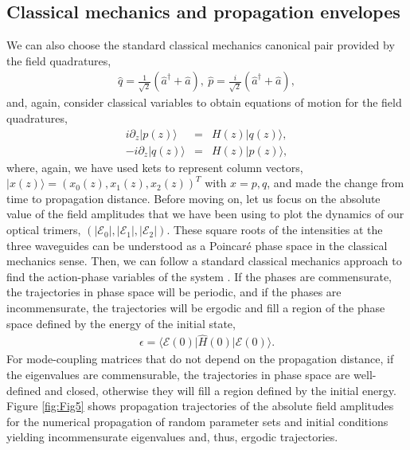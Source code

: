 \documentclass[9pt,twocolumn,twoside]{osajnl}
\begin{document}
\subsection{Classical mechanics and propagation envelopes }
We can also choose the standard classical mechanics canonical pair  provided by the field quadratures, 
\begin{eqnarray}
	\hat{q} = \frac{1}{\sqrt{2}} \left( \hat{a}^{\dagger} + \hat{a} \right), ~ 
	\hat{p} = \frac{i}{\sqrt{2}} \left( \hat{a}^{\dagger} + \hat{a} \right),
\end{eqnarray}
and, again, consider classical variables to obtain equations of motion for the field quadratures,
\begin{eqnarray}
	i \partial_z \vert p(z) \rangle	
	 &=&
	H(z) \vert q(z) \rangle , \\
-	i \partial_z \vert q(z) \rangle	 &=& 
    H(z)	\vert p(z) \rangle,
\end{eqnarray}
where, again, we have used kets to represent column vectors, $\vert x(z) \rangle = \left( x_{0}(z), x_{1}(z), x_{2}(z) \right)^{T}$ with $x=p,q$, and made the change from time to propagation distance.
Before moving on, let us focus on the absolute value of the field amplitudes that we have been using to plot the dynamics of our optical trimers, $(\vert \mathcal{E}_{0} \vert,\vert \mathcal{E}_{1} \vert,\vert \mathcal{E}_{2} \vert )$.
These square roots of the intensities at the three waveguides can be understood as a Poincar\'e phase space in the classical mechanics sense.
Then, we can follow a standard classical mechanics approach to find the action-phase variables of the system \cite{Goldstein1980}. 
If the phases are commensurate, the trajectories in phase space will be periodic, and if the phases are incommensurate, the trajectories will be ergodic and fill a region of the phase space defined by the energy of the initial state,
\begin{eqnarray}
\epsilon = \langle \mathcal{E}(0) \vert \hat{H}(0) \vert \mathcal{E}(0) \rangle.
\end{eqnarray}  
For mode-coupling matrices that do not depend on the propagation distance, if the eigenvalues are commensurable, the trajectories in phase space are well-defined and closed, otherwise they will fill a region defined by the initial energy.
Figure \ref{fig:Fig5} shows propagation trajectories of the absolute field amplitudes for the numerical propagation of random parameter sets and initial conditions yielding incommensurate eigenvalues and, thus, ergodic trajectories.
\end{document}
